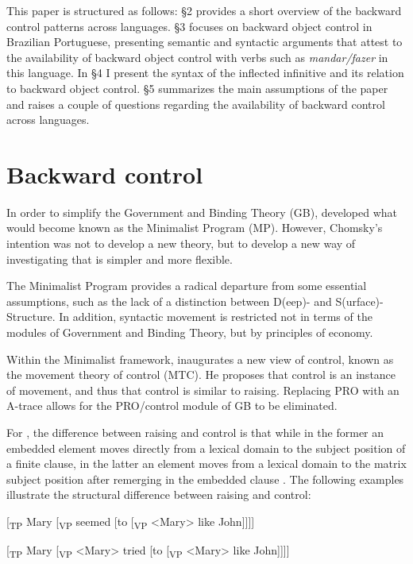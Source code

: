 \documentclass[output=paper]{langsci/langscibook}
\begin{document}
This paper is structured as follows: §2 provides a short overview of the backward control patterns across languages. §3 focuses on backward object control in Brazilian Portuguese, presenting semantic and syntactic arguments that attest to the availability of backward object control with verbs such as \textit{mandar\slash fazer} in this language. In §4 I present the syntax of the inflected infinitive and its relation to backward object control. §5 summarizes the main assumptions of the paper and raises a couple of questions regarding the availability of backward control across languages.

\section{Backward control}%

In order to simplify the Government and Binding Theory (GB), \citet{Chomsky1993} developed what would become known as the Minimalist Program (MP). However, Chomsky’s intention was not to develop a new theory, but to develop a new way of investigating that is simpler and more flexible.

The Minimalist Program provides a radical departure from some essential assumptions, such as the lack of a distinction between D(eep)- and S(urface)-Structure. In addition, syntactic movement is restricted not in terms of the modules of Government and Binding Theory, but by principles of economy. 

Within the Minimalist framework, \citet{Hornstein1999,Hornstein2001} inaugurates a new view of control, known as the movement theory of control (MTC). He proposes that control is an instance of movement, and thus that control is similar to raising. Replacing PRO with an A-trace allows for the PRO\slash control module of GB to be eliminated.

For \citet{Hornstein1999}, the difference between raising and control is that while in the former an embedded element moves directly from a lexical domain to the subject position of a finite clause, in the latter an element moves from a lexical domain to the matrix subject position after remerging in the embedded clause \citep{Boeckx2006}. The following examples illustrate the structural difference between raising and control:

\ea%
    \label{ex:moreno:3b}
[\textsubscript{TP} Mary [\textsubscript{VP} seemed [to [\textsubscript{VP} <Mary> like John]]]]
\z

\ea%
\label{ex:moreno:4b}
[\textsubscript{TP} Mary [\textsubscript{VP} <Mary> tried [to [\textsubscript{VP} <Mary> like John]]]]
\z
\end{document}
